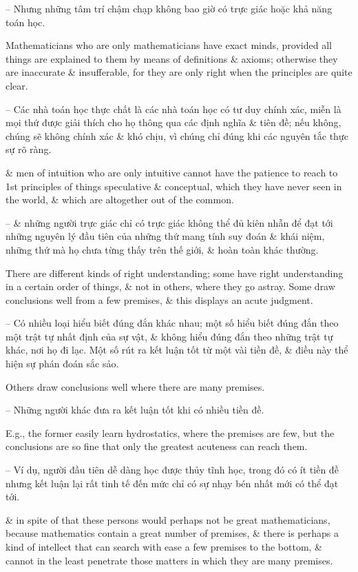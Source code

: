 \documentclass{article}
\begin{document}
\begin{enumerate}
\begin{itemize}
		-- Nhưng những tâm trí chậm chạp không bao giờ có trực giác hoặc khả năng toán học.
		
		Mathematicians who are only mathematicians have exact minds, provided all things are explained to them by means of definitions \& axioms; otherwise they are inaccurate \& insufferable, for they are only right when the principles are quite clear.
		
		-- Các nhà toán học thực chất là các nhà toán học có tư duy chính xác, miễn là mọi thứ được giải thích cho họ thông qua các định nghĩa \& tiên đề; nếu không, chúng sẽ không chính xác \& khó chịu, vì chúng chỉ đúng khi các nguyên tắc thực sự rõ ràng.
		
		\& men of intuition who are only intuitive cannot have the patience to reach to 1st principles of things speculative \& conceptual, which they have never seen in the world, \& which are altogether out of the common.
		
		-- \& những người trực giác chỉ có trực giác không thể đủ kiên nhẫn để đạt tới những nguyên lý đầu tiên của những thứ mang tính suy đoán \& khái niệm, những thứ mà họ chưa từng thấy trên thế giới, \& hoàn toàn khác thường.
		
		 There are different kinds of right understanding; some have right understanding in a certain order of things, \& not in others, where they go astray. Some draw conclusions well from a few premises, \& this displays an acute judgment.
		
		-- Có nhiều loại hiểu biết đúng đắn khác nhau; một số hiểu biết đúng đắn theo một trật tự nhất định của sự vật, \& không hiểu đúng đắn theo những trật tự khác, nơi họ đi lạc. Một số rút ra kết luận tốt từ một vài tiền đề, \& điều này thể hiện sự phán đoán sắc sảo.
		
		Others draw conclusions well where there are many premises.
		
		-- Những người khác đưa ra kết luận tốt khi có nhiều tiền đề.
		
		E.g., the former easily learn hydrostatics, where the premises are few, but the conclusions are so fine that only the greatest acuteness can reach them.
		
		-- Ví dụ, người đầu tiên dễ dàng học được thủy tĩnh học, trong đó có ít tiền đề nhưng kết luận lại rất tinh tế đến mức chỉ có sự nhạy bén nhất mới có thể đạt tới.
		
		\& in spite of that these persons would perhaps not be great mathematicians, because mathematics contain a great number of premises, \& there is perhaps a kind of intellect that can search with ease a few premises to the bottom, \& cannot in the least penetrate those matters in which they are many premises.
		

\end{itemize}
\end{enumerate}
\end{document}
